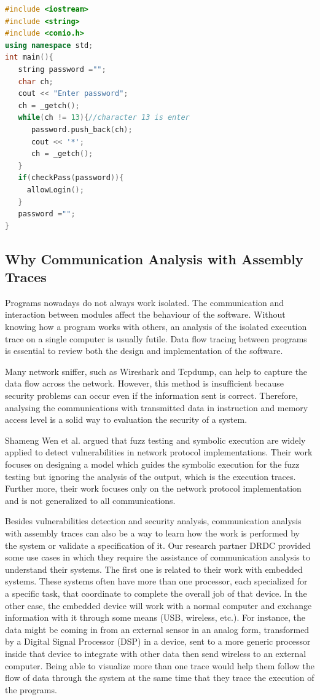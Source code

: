 \begin{lstlisting}[language=C++, caption= Password Fetching Example ]
#include <iostream>
#include <string>
#include <conio.h>
using namespace std;
int main(){
   string password ="";
   char ch;
   cout << "Enter password";
   ch = _getch();
   while(ch != 13){//character 13 is enter
      password.push_back(ch);
      cout << '*';
      ch = _getch();
   }   
   if(checkPass(password)){
     allowLogin();
   }  
   password ="";
}
\end{lstlisting}

\subsection{Why Communication Analysis with Assembly Traces}
Programs nowadays do not always work isolated. The communication and interaction between modules affect the behaviour of the software. Without knowing how a program works with others, an analysis of the isolated execution trace on a single computer is usually futile. Data flow tracing between programs is essential to review both the design and implementation of the software.

Many network sniffer, such as Wireshark\cite{_wireshark_????} and Tcpdump\cite{tcpdump_tcpdump/libpcap_????}, can help to capture the data flow across the network. However, this method  is insufficient because security problems can occur even if the information sent is correct. Therefore, analysing the communications with transmitted data in instruction and memory access level is a solid way to evaluation the security of a system.

Shameng Wen et al. argued that fuzz testing and symbolic execution are widely applied to detect vulnerabilities in network protocol implementations. Their work focuses on designing a model which guides the symbolic execution for the fuzz testing \cite{wen2017model} but ignoring the analysis of the output, which is the execution traces. Further more, their work focuses only on the network protocol implementation and is not generalized to all communications.

Besides vulnerabilities detection and security analysis, communication analysis with assembly traces can also be a way to learn how the work is performed by the system or validate a specification of it. Our research partner DRDC provided some use cases in which they require the assistance of communication analysis to understand their systems. The first one is related to their work with embedded systems. These systems often have more than one processor, each specialized for a specific task, that coordinate to complete the overall job of that device.  In the other case, the embedded device will work with a normal computer and exchange information with it through some means
(USB, wireless, etc.).  For instance, the data might be coming in from an external sensor in an analog form, transformed by a Digital Signal Processor (DSP) in a device, sent to a more generic processor inside that device to integrate with other data then send wireless to an external computer. Being able to visualize more than one trace would help them follow the flow of data through the system at the same time that they trace the execution of the programs.

